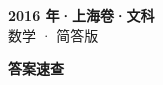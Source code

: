 \documentclass[zihao=-4, a4paper]{ctexart}
\begin{document}
\begin{center}
  {\Large\bfseries 2016 年·上海卷·文科}\\[4pt]
  {\large 数学 · 简答版}
\end{center}
\medskip
{}

\clearpage
{}
\begin{center}{\Large\bfseries 答案速查}\end{center}
\medskip

\end{document}
